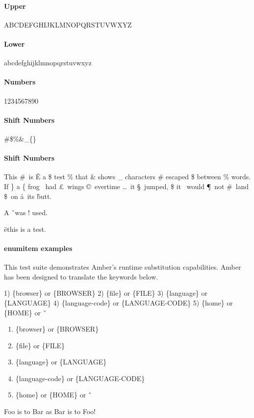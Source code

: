 \documentclass[12pt]{article}%
\begin{document}
%

\paragraph{Upper}
ABCDEFGHIJKLMNOPQRSTUVWXYZ

\paragraph{Lower}
abcdefghijklmnopqrstuvwxyz

\paragraph{Numbers}
1234567890

\paragraph{Shift Numbers}
\#\$\%\&\_\{\}

\paragraph{Shift Numbers}
This \#\ is \v{E} a \$ test \% that \& shows \_ characters \# escaped \$ between \%
words.  If \} a \{ frog \ddag\ had \pounds\ wings \copyright\ evertime \dots\
it \S\ jumped, \$ it \dag\ would \P\ not \#\ land \$\ on \aa\ its \^ butt.

A \~\ was ! used.

\"{e}this is a test.

\paragraph{enumitem examples}
\begin{description}[align=right,leftmargin=3.2cm,labelindent=3.0cm]
  \item[Purpose:]
    This test suite demonstrates Amber's runtime substitution capabilities.
    Amber has been designed to translate the keywords below.

    1) \{browser\} or \{BROWSER\}
    2) \{file\} or \{FILE\}  
    3) \{language\} or \{LANGUAGE\}  
    4) \{language-code\} or \{LANGUAGE-CODE\}  
    5) \{home\} or \{HOME\} or \~\

    \begin{enumerate}
      \item \{browser\} or \{BROWSER\}
      \item \{file\} or \{FILE\}  
      \item \{language\} or \{LANGUAGE\}  
      \item \{language-code\} or \{LANGUAGE-CODE\}  
      \item \{home\} or \{HOME\} or \~\
    \end{enumerate}

  \item[Foo:] Foo is to Bar as Bar is to Foo!

\end{description} 
\end{document}
